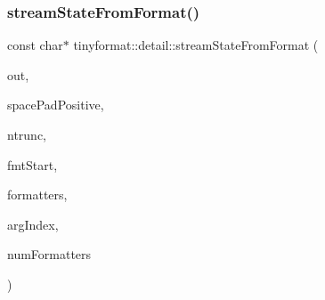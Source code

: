 \mbox{\label{namespacetinyformat_1_1detail_a681e8ceb825485cc5e3b057c11e4b1b5}} 
\subsubsection{\texorpdfstring{stream\+State\+From\+Format()}{streamStateFromFormat()}}
{\footnotesize\ttfamily const char$\ast$ tinyformat\+::detail\+::stream\+State\+From\+Format (\begin{DoxyParamCaption}\item[{std\+::ostream \&}]{out,  }\item[{bool \&}]{space\+Pad\+Positive,  }\item[{int \&}]{ntrunc,  }\item[{const char $\ast$}]{fmt\+Start,  }\item[{const \mbox{\hyperlink{classtinyformat_1_1detail_1_1_format_arg}{detail\+::\+Format\+Arg}} $\ast$}]{formatters,  }\item[{int \&}]{arg\+Index,  }\item[{int}]{num\+Formatters }\end{DoxyParamCaption})\hspace{0.3cm}{\ttfamily [inline]}}

